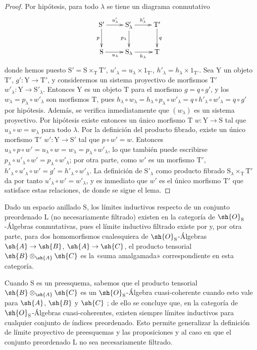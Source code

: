 \begin{proof}
Por hipótesis, para todo $\lambda$ se tiene un diagrama conmutativo
\[
\xymatrix{
  \mathrm{S}' \ar[r]^{u'_\lambda} \ar[d]_p & \mathrm{S}'_\lambda \ar[r]^{h'_\lambda} \ar[d]_{p_\lambda} & \mathrm{T}' \ar[d]^q \\
  \mathrm{S} \ar[r]_{u_\lambda} & \mathrm{S}_\lambda \ar[r]_{h_\lambda} & \mathrm{T}
}
\]
donde hemos puesto $\mathrm{S}'=\mathrm{S}\times_\mathrm{T}\mathrm{T}'$, $u'_\lambda=u_\lambda\times 1_{\mathrm{T}'}$, $h'_\lambda=h_\lambda\times 1_{\mathrm{T}'}$.
Sea $\mathrm{Y}$ un objeto $\mathrm{T}'$, $g':\mathrm{Y}\to\mathrm{T}'$, y consideremos un sistema proyectivo de morfismos $\mathrm{T}'$ $w'_\lambda:\mathrm{Y}\to\mathrm{S}'_\lambda$.
Entonces $\mathrm{Y}$ es un objeto $\mathrm{T}$ para el morfismo $g=q\circ g'$, y los $w_\lambda=p_\lambda\circ w'_\lambda$ son morfismos $\mathrm{T}$, pues $h_\lambda\circ w_\lambda=h_\lambda\circ p_\lambda\circ w'_\lambda=q\circ h'_\lambda\circ w'_\lambda=q\circ g'$ por hipótesis.
Además, se verifica inmediatamente que $(w_\lambda)$ es un sistema proyectivo.
Por hipótesis existe entonces un único morfismo $\mathrm{T}$ $w:\mathrm{Y}\to\mathrm{S}$ tal que $u_\lambda\circ w=w_\lambda$ para todo $\lambda$.
Por la definición del producto fibrado, existe un único morfismo $\mathrm{T}'$ $w':\mathrm{Y}\to\mathrm{S}'$ tal que $p\circ w'=w$.
Entonces $u_\lambda\circ p\circ w'=u_\lambda\circ w=w_\lambda=p_\lambda\circ w'_\lambda$, lo que también puede escribirse $p_\lambda\circ u'_\lambda\circ w'=p_\lambda\circ w'_\lambda$; por otra parte, como $w'$ es un morfismo $\mathrm{T}'$, $h'_\lambda\circ u'_\lambda\circ w'=g'=h'_\lambda\circ w'_\lambda$. La definición de $\mathrm{S}'_\lambda$ como producto fibrado $\mathrm{S}_\lambda\times_\mathrm{T}\mathrm{T}'$ da por tanto $u'_\lambda\circ w'=w'_\lambda$, y es inmediato que $w'$ es el único morfismo $\mathrm{T}'$ que satisface estas relaciones, de donde se sigue el lema.
\end{proof}

\begin{remark}[8.2.7]
\label{IV.8.2.7}
Dado un espacio anillado $\mathrm{S}$, los límites inductivos respecto de un conjunto preordenado $\mathrm{L}$ (no necesariamente filtrado) existen en la categoría de $\sh{O}_\mathrm{S}$-Álgebras conmutativas, pues el límite inductivo filtrado existe por  y, por otra parte, para dos homomorfismos cualesquiera de $\sh{O}_\mathrm{S}$-Álgebras $\sh{A}\to\sh{B}$, $\sh{A}\to\sh{C}$, el producto tensorial $\sh{B}\otimes_{\sh{A}}\sh{C}$ es la «suma amalgamada» correspondiente en esta categoría.

Cuando $\mathrm{S}$ es un preesquema, sabemos que el producto tensorial $\sh{B}\otimes_{\sh{A}}\sh{C}$ es un $\sh{O}_\mathrm{S}$-Álgebra cuasi-coherente cuando esto vale para $\sh{A}$, $\sh{B}$ y $\sh{C}$ ; de ello se concluye que, en la categoría de $\sh{O}_\mathrm{S}$-Álgebras cuasi-coherentes, existen siempre límites inductivos para cualquier conjunto de índices preordenado.
Esto permite generalizar la definición de límite proyectivo de preesquemas y las proposiciones  y  al caso en que el conjunto preordenado $\mathrm{L}$ no sea necesariamente filtrado.
\end{remark}

